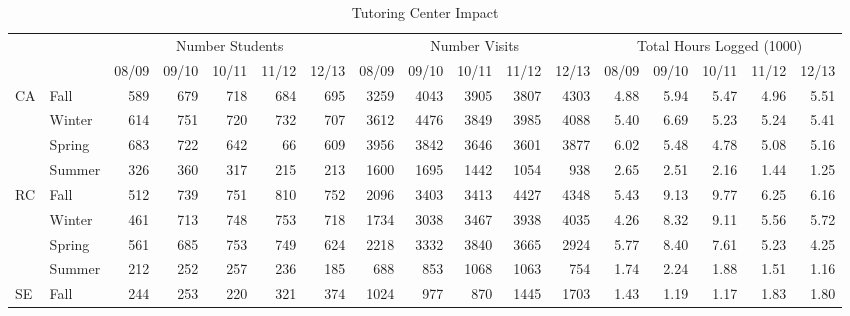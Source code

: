 \afterpage{\global\pdfpageattr\expandafter{\the\pdfpageattr/Rotate 90}}

\clearpage

\begin{sidewaystable}[!h]
	\centering
	\caption{Tutoring Center Impact}\label{app:tut:tab:SLC}
    \begin{tabular}{llrrrrrrrrrrrrrrr}
		\toprule
		&        &\multicolumn{5}{c}{Number Students}&\multicolumn{5}{c}{Number Visits}&\multicolumn{5}{c}{Total Hours Logged (1000)}\\
		                    &        & 08/09 & 09/10 & 10/11 & 11/12 & 12/13 & 08/09 & 09/10 & 10/11 & 11/12 & 12/13  & 08/09 & 09/10 & 10/11 & 11/12 & 12/13 \\
		\midrule
		\multirow{4}{*}{CA} & Fall   & 589   & 679   & 718   & 684   & 695   & 3259  & 4043  & 3905  & 3807 & 4303   & 4.88 & 5.94 & 5.47 & 4.96 & 5.51 \\
		                    & Winter & 614   & 751   & 720   & 732   & 707   & 3612  & 4476  & 3849  & 3985 & 4088   & 5.40 & 6.69 & 5.23 & 5.24 & 5.41 \\
		                    & Spring & 683   & 722   & 642   & 66    & 609   & 3956  & 3842  & 3646  & 3601 & 3877   & 6.02 & 5.48 & 4.78 & 5.08 & 5.16 \\
		                    & Summer & 326   & 360   & 317   & 215   & 213   & 1600  & 1695  & 1442  & 1054 & 938    & 2.65 & 2.51 & 2.16 & 1.44 & 1.25 \\
		\cmidrule{2-17}
		\multirow{4}{*}{RC} & Fall   & 512   & 739   & 751   & 810   & 752   & 2096  & 3403  & 3413  & 4427 & 4348   & 5.43 & 9.13 & 9.77 & 6.25 & 6.16 \\
		                    & Winter & 461   & 713   & 748   & 753   & 718   & 1734  & 3038  & 3467  & 3938 & 4035   & 4.26 & 8.32 & 9.11 & 5.56 & 5.72 \\
		                    & Spring & 561   & 685   & 753   & 749   & 624   & 2218  & 3332  & 3840  & 3665 & 2924   & 5.77 & 8.40 & 7.61 & 5.23 & 4.25 \\
		                    & Summer & 212   & 252   & 257   & 236   & 185   & 688   & 853   & 1068  & 1063 & 754    & 1.74 & 2.24 & 1.88 & 1.51 & 1.16 \\
		\cmidrule{2-17}
		\multirow{4}{*}{SE} & Fall   & 244   & 253   & 220   & 321   & 374   & 1024  & 977   & 870   & 1445 & 1703   & 1.43 & 1.19 & 1.17 & 1.83 & 1.80 \\

\end{tabular}
\end{sidewaystable}
